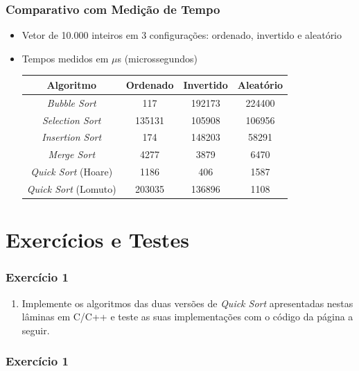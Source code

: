 \documentclass[aspectratio=169]{beamer}
\begin{document}
\begin{frame}\frametitle{Comparativo com Medição de Tempo}
\begin{itemize}
	\item Vetor de 10.000 inteiros em 3 configurações: ordenado, invertido e aleatório
	\item Tempos medidos em $\mu$s (microssegundos)
\begin{center}
\begin{tabular}{|c|c|c|c|}
\hline
\textbf{Algoritmo} & \textbf{Ordenado} & \textbf{Invertido} & \textbf{Aleatório}\\
\hline
\emph{Bubble Sort} & 117 & 192173 & 224400 \\
\hline
\emph{Selection Sort} & 135131 & 105908 & 106956\\
\hline
\emph{Insertion Sort} & 174 & 148203 & 58291\\
\hline
\emph{Merge Sort} & 4277 & 3879 & 6470\\
\hline
\emph{Quick Sort} (Hoare) & 1186 & 406 & 1587\\
\hline
\emph{Quick Sort} (Lomuto) & 203035 & 136896 & 1108\\
\hline
\end{tabular}
\end{center}
\end{itemize}
\end{frame}

\section{Exercícios e Testes}

\begin{frame}\frametitle{Exercício 1}
\begin{enumerate}
	\item Implemente os algoritmos das duas versões de \emph{Quick Sort} apresentadas nestas lâminas em C/C++ e teste as suas implementações com o código da página a seguir.
\end{enumerate}
\end{frame}

\begin{frame}\frametitle{Exercício 1}
\fontsize{1}{5}\selectfont{

}
\end{frame}
\end{document}
